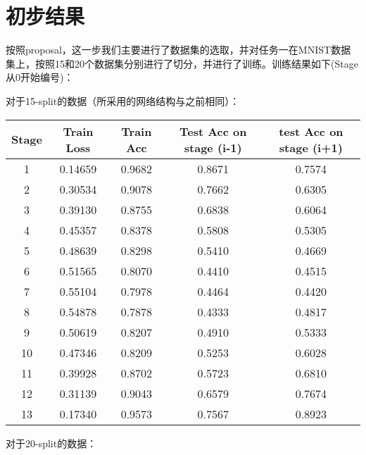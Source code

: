 \documentclass{article}
\begin{document}
\section{初步结果}

按照proposal，这一步我们主要进行了数据集的选取，并对任务一在MNIST数据集上，按照15和20个数据集分别进行了切分，并进行了训练。训练结果如下(Stage从0开始编号)：

对于15-split的数据（所采用的网络结构与之前相同）：

\begin{center}
    \begin{tabular}{|c|c|c|c|c|}
        \hline
        Stage & Train Loss & Train Acc & Test Acc on stage (i-1) & test Acc on stage (i+1) \\
        \hline
        1 & 0.14659 & 0.9682 & 0.8671 & 0.7574 \\
        \hline
        2 & 0.30534 & 0.9078 & 0.7662 & 0.6305 \\
        \hline
        3 & 0.39130 & 0.8755 & 0.6838 & 0.6064 \\
        \hline
        4 & 0.45357 & 0.8378 & 0.5808 & 0.5305 \\
        \hline
        5 & 0.48639 & 0.8298 & 0.5410 & 0.4669 \\
        \hline
        6 & 0.51565 & 0.8070 & 0.4410 & 0.4515 \\
        \hline
        7 & 0.55104 & 0.7978 & 0.4464 & 0.4420 \\
        \hline
        8 & 0.54878 & 0.7878 & 0.4333 & 0.4817 \\
        \hline
        9 & 0.50619 & 0.8207 & 0.4910 & 0.5333 \\
        \hline
        10 & 0.47346 & 0.8209 & 0.5253 & 0.6028 \\
        \hline
        11 & 0.39928 & 0.8702 & 0.5723 & 0.6810 \\
        \hline
        12 & 0.31139 & 0.9043 & 0.6579 & 0.7674 \\
        \hline
        13 & 0.17340 & 0.9573 & 0.7567 & 0.8923 \\
        \hline
    \end{tabular}
\end{center}

对于20-split的数据：
\end{document}
